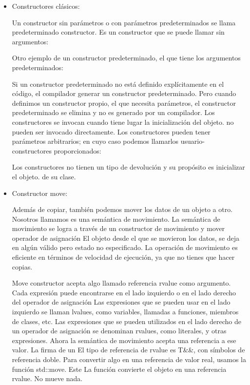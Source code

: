 \documentclass[10pt]{article}
\begin{document}
\begin{itemize}
	\item Constructores cl\'asicos:
	
	Un constructor sin parámetros o con parámetros predeterminados se llama predeterminado
	constructor. Es un constructor que se puede llamar sin argumentos:
	
	Otro ejemplo de un constructor predeterminado, el que tiene los argumentos predeterminados:
	
	Si un constructor predeterminado no está definido explícitamente en el código, el compilador
	generar un constructor predeterminado. Pero cuando definimos un constructor propio, el
	que necesita parámetros, el constructor predeterminado se elimina y no es generado por un
	compilador.
	Los constructores se invocan cuando tiene lugar la inicialización del objeto. no pueden ser
	invocado directamente.
	Los constructores pueden tener parámetros arbitrarios; en cuyo caso podemos llamarlos usuario-
	constructores proporcionados:
	
	Los constructores no tienen un tipo de devolución y su propósito es inicializar el objeto.
	de su clase.
	
	\item Constructor move:
	
	Además de copiar, también podemos mover los datos de un objeto a otro. Nosotros llamamos
	es una semántica de movimiento. La semántica de movimiento se logra a través de un constructor de movimiento y mover
	operador de asignación El objeto desde el que se movieron los datos, se deja en algún válido pero
	estado no especificado. La operación de movimiento es eficiente en términos de velocidad de ejecución, ya que
	no tienes que hacer copias.
	
	Move constructor acepta algo llamado referencia rvalue como argumento.
	Cada expresión puede encontrarse en el lado izquierdo o en el lado derecho del
	operador de asignación Las expresiones que se pueden usar en el lado izquierdo se llaman
	lvalues, como variables, llamadas a funciones, miembros de clases, etc. Las expresiones que se pueden
	utilizados en el lado derecho de un operador de asignación se denominan rvalues, como literales,
	y otras expresiones.
	Ahora la semántica de movimiento acepta una referencia a ese valor. La firma de un
	El tipo de referencia de rvalue es T\&\&, con símbolos de referencia doble.
	Para convertir algo en una referencia de valor real, usamos la función std::move. Este
	La función convierte el objeto en una referencia rvalue. No mueve nada.
	

\end{itemize}
\end{document}
